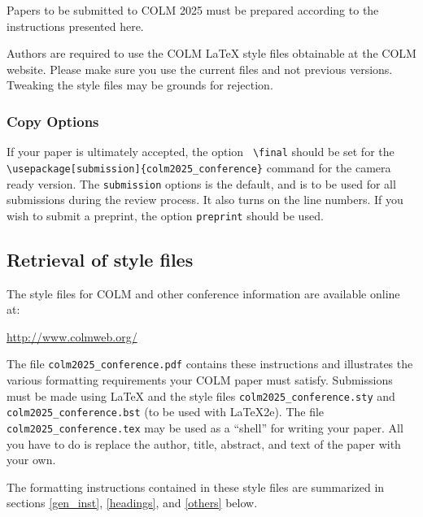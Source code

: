 \documentclass{article} %
\begin{document}
Papers to be submitted to COLM 2025 must be prepared according to the
instructions presented here.


Authors are required to use the COLM \LaTeX{} style files obtainable at the
COLM website. Please make sure you use the current files and
not previous versions. Tweaking the style files may be grounds for rejection.

\subsubsection{Copy Options}

If your paper is ultimately accepted, the option {\tt
  {\textbackslash}final} should be set  for the {\tt {\textbackslash}usepackage[submission]\{colm2025\_conference\}} command for the camera ready version. The {\tt submission} options is the default, and is to be used for all submissions during the review process. It also turns on the line numbers. If you wish to submit a preprint, the option {\tt preprint} should be used.
  
  

\subsection{Retrieval of style files}

The style files for COLM and other conference information are available online at:
\begin{center}
   \url{http://www.colmweb.org/}
\end{center}
The file \verb+colm2025_conference.pdf+ contains these
instructions and illustrates the
various formatting requirements your COLM paper must satisfy.
Submissions must be made using \LaTeX{} and the style files
\verb+colm2025_conference.sty+ and \verb+colm2025_conference.bst+ (to be used with \LaTeX{}2e). The file
\verb+colm2025_conference.tex+ may be used as a ``shell'' for writing your paper. All you
have to do is replace the author, title, abstract, and text of the paper with
your own.

The formatting instructions contained in these style files are summarized in
sections \ref{gen_inst}, \ref{headings}, and \ref{others} below.
\end{document}
